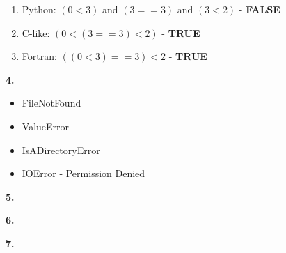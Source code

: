 \documentclass[11pt]{article} %
\begin{document}
\begin{enumerate}[label=\alph*.]
\item Python: $(0 < 3)$ and $(3 == 3)$ and $(3 < 2)$ - {\bf FALSE}
\item C-like: $(0 < (3 == 3) < 2)$ - {\bf TRUE}
\item Fortran: $((0 < 3) == 3) < 2$ - {\bf TRUE}
\end{enumerate}


\vskip 0.3in
{\bf 4.}

\begin{itemize}
\item FileNotFound
\item ValueError
\item IsADirectoryError
\item IOError - Permission Denied
\end{itemize}

\newpage
{\bf 5.}
\medskip

\fbox{
	\rule{6 in}{0pt}
	\rule[8 in]{0pt}{4ex}
}

\newpage
{\bf 6.}
\medskip

\fbox{
	\rule{6 in}{0pt}
	\rule[8 in]{0pt}{4ex}
}

\newpage
{\bf 7.}
\medskip

\fbox{
	\rule{6 in}{0pt}
	\rule[8 in]{0pt}{4ex}
}
\end{document}
